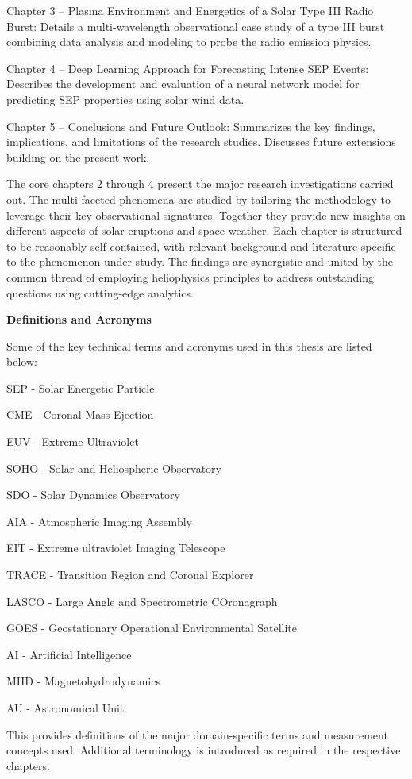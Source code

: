 Chapter 3 – Plasma Environment and Energetics of a Solar Type III Radio Burst: Details a multi-wavelength observational case study of a type III burst combining data analysis and modeling to probe the radio emission physics. 

Chapter 4 – Deep Learning Approach for Forecasting Intense SEP Events: Describes the development and evaluation of a neural network model for predicting SEP properties using solar wind data.

Chapter 5 – Conclusions and Future Outlook: Summarizes the key findings, implications, and limitations of the research studies. Discusses future extensions building on the present work.

The core chapters 2 through 4 present the major research investigations carried out. The multi-faceted phenomena are studied by tailoring the methodology to leverage their key observational signatures. Together they provide new insights on different aspects of solar eruptions and space weather. Each chapter is structured to be reasonably self-contained, with relevant background and literature specific to the phenomenon under study. The findings are synergistic and united by the common thread of employing heliophysics principles to address outstanding questions using cutting-edge analytics.

\textbf{Definitions and Acronyms}

Some of the key technical terms and acronyms used in this thesis are listed below:

SEP - Solar Energetic Particle

CME - Coronal Mass Ejection 

EUV - Extreme Ultraviolet

SOHO - Solar and Heliospheric Observatory

SDO - Solar Dynamics Observatory

AIA - Atmospheric Imaging Assembly 

EIT - Extreme ultraviolet Imaging Telescope

TRACE - Transition Region and Coronal Explorer

LASCO - Large Angle and Spectrometric COronagraph

GOES - Geostationary Operational Environmental Satellite

AI - Artificial Intelligence

MHD - Magnetohydrodynamics

AU - Astronomical Unit

This provides definitions of the major domain-specific terms and measurement concepts used. Additional terminology is introduced as required in the respective chapters.
